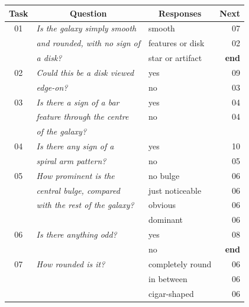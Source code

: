 \documentclass[useAMS,usenatbib]{mn2e}
\begin{document}
\begin{table}
 \begin{tabular}{@{}cllr}
 \hline
\multicolumn{1}{l}{Task} &
\multicolumn{1}{c}{Question} &
\multicolumn{1}{c}{Responses} &
\multicolumn{1}{c}{Next} 
\\ 
\hline
\hline						%
01    & {\it Is the galaxy simply smooth   }  & smooth           & 07 \\
      & {\it and rounded, with no sign of  }  & features or disk & 02 \\
      & {\it a disk?                       }  & star or artifact & {\bf end} \\
      \hline
02    & {\it Could this be a disk viewed   }  & yes              & 09 \\
      & {\it edge-on?                      }  & no               & 03 \\
      \hline
03    & {\it Is there a sign of a bar      }  & yes              & 04 \\
      & {\it feature through the centre    }  & no               & 04 \\
      & {\it of the galaxy?                }                                        \\
      \hline
04    & {\it Is there any sign of a        }  & yes              & 10 \\
      & {\it spiral arm pattern?           }  & no               & 05 \\
      \hline
05    & {\it How prominent is the          }  & no bulge         & 06 \\
      & {\it central bulge, compared       }  & just noticeable  & 06 \\
      & {\it with the rest of the galaxy?  }  & obvious          & 06 \\
      & {\it                               }  & dominant         & 06 \\
      \hline
06    & {\it Is there anything odd?        }  & yes              & 08 \\ 
      & {\it                               }  & no               & {\bf end}        \\
      \hline
07    & {\it How rounded is it?            }  & completely round & 06 \\
      & {\it                               }  & in between       & 06 \\
      & {\it                               }  & cigar-shaped     & 06 \\
      \hline

\end{tabular}
\end{table}
\end{document}
